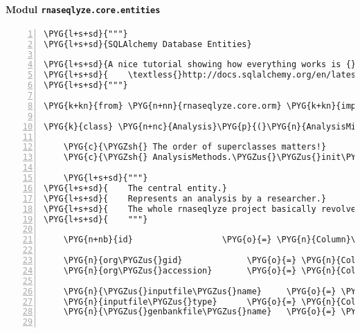 \paragraph{Modul \texttt{rnaseqlyze.core.entities}}
\label{rnaseqlyze-pdf:modul-rnaseqlyze-core-entities}
\begin{Verbatim}[commandchars=\\\{\},numbers=left,firstnumber=1,stepnumber=5]
\PYG{l+s+sd}{"""}
\PYG{l+s+sd}{SQLAlchemy Database Entities}

\PYG{l+s+sd}{A nice tutorial showing how everything works is {}`here}
\PYG{l+s+sd}{    \textless{}http://docs.sqlalchemy.org/en/latest/orm/tutorial.html\textgreater{}{}`\PYGZus{}.}
\PYG{l+s+sd}{"""}

\PYG{k+kn}{from} \PYG{n+nn}{rnaseqlyze.core.orm} \PYG{k+kn}{import} \PYG{o}{*}

\PYG{k}{class} \PYG{n+nc}{Analysis}\PYG{p}{(}\PYG{n}{AnalysisMixins}\PYG{p}{,} \PYG{n}{Entity}\PYG{p}{)}\PYG{p}{:}

    \PYG{c}{\PYGZsh{} The order of superclasses matters!}
    \PYG{c}{\PYGZsh{} AnalysisMethods.\PYGZus{}\PYGZus{}init\PYGZus{}\PYGZus{} calls Entity.\PYGZus{}\PYGZus{}init\PYGZus{}\PYGZus{}}

    \PYG{l+s+sd}{"""}
\PYG{l+s+sd}{    The central entity.}
\PYG{l+s+sd}{    Represents an analysis by a researcher.}
\PYG{l+s+sd}{    The whole rnaseqlyze project basically revolves around this entity.}
\PYG{l+s+sd}{    """}

    \PYG{n+nb}{id}                  \PYG{o}{=} \PYG{n}{Column}\PYG{p}{(}\PYG{n}{Integer}\PYG{p}{,} \PYG{n}{primary\PYGZus{}key}\PYG{o}{=}\PYG{n+nb+bp}{True}\PYG{p}{)}

    \PYG{n}{org\PYGZus{}gid}             \PYG{o}{=} \PYG{n}{Column}\PYG{p}{(}\PYG{n}{Integer}\PYG{p}{)}  \PYG{c}{\PYGZsh{} Organisms Genebank/Entrez gid}
    \PYG{n}{org\PYGZus{}accession}       \PYG{o}{=} \PYG{n}{Column}\PYG{p}{(}\PYG{n}{String}\PYG{p}{)}   \PYG{c}{\PYGZsh{} Organisms Genebank accession number}

    \PYG{n}{\PYGZus{}inputfile\PYGZus{}name}     \PYG{o}{=} \PYG{n}{Column}\PYG{p}{(}\PYG{l+s}{"}\PYG{l+s}{inputfile\PYGZus{}name}\PYG{l+s}{"}\PYG{p}{,} \PYG{n}{String}\PYG{p}{)}
    \PYG{n}{inputfile\PYGZus{}type}      \PYG{o}{=} \PYG{n}{Column}\PYG{p}{(}\PYG{n}{String}\PYG{p}{)}
    \PYG{n}{\PYGZus{}genbankfile\PYGZus{}name}   \PYG{o}{=} \PYG{n}{Column}\PYG{p}{(}\PYG{l+s}{"}\PYG{l+s}{genbankfile\PYGZus{}name}\PYG{l+s}{"}\PYG{p}{,} \PYG{n}{String}\PYG{p}{)}


\end{Verbatim}
